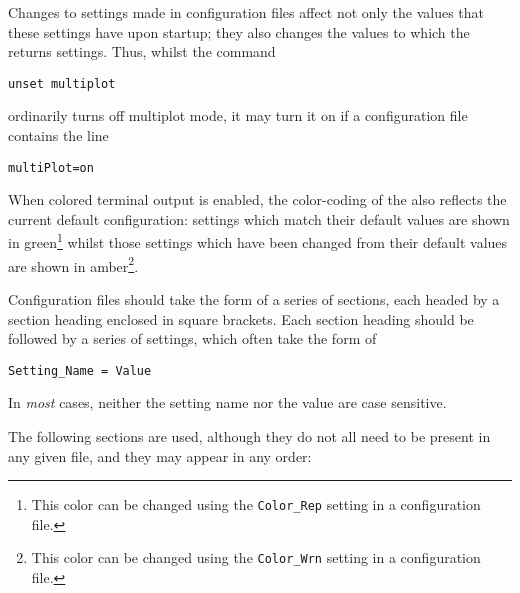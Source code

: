 Changes to settings made in configuration files affect not only the values that
these settings have upon startup; they also changes the values to which the
 returns settings. Thus, whilst the command
\begin{verbatim}
unset multiplot
\end{verbatim}
ordinarily turns off multiplot mode, it may turn it on if a configuration file
contains the line
\begin{verbatim}
multiPlot=on
\end{verbatim}
When colored terminal output is enabled, the color-coding of the
 also reflects the current default configuration: settings which
match their default values are shown in green\footnote{This color can be
changed using the {\tt Color\_Rep} setting in a configuration file.} whilst
those settings which have been changed from their default values are shown in
amber\footnote{This color can be changed using the {\tt Color\_Wrn} setting
in a configuration file.}.

Configuration files should take the form of a series of sections, each headed
by a section heading enclosed in square brackets. Each section heading should
be followed by a series of settings, which often take the form of
\begin{verbatim}
Setting_Name = Value
\end{verbatim}
In {\it most} cases, neither the setting name nor the value are case sensitive.

The following sections are used, although they do not all need to be present in
any given file, and they may appear in any order:


